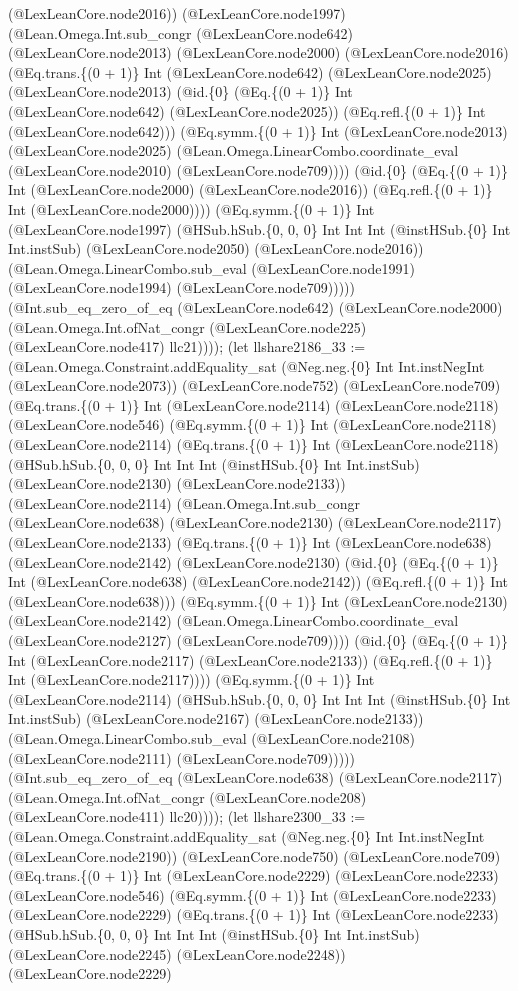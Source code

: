 \documentclass[11pt]{article}
\begin{document}
(@LexLeanCore.node2016)) (@LexLeanCore.node1997) (@Lean.Omega.Int.sub\_congr (@LexLeanCore.node642) (@LexLeanCore.node2013) (@LexLeanCore.node2000) (@LexLeanCore.node2016) (@Eq.trans.\{(0 + 1)\} Int (@LexLeanCore.node642) (@LexLeanCore.node2025) (@LexLeanCore.node2013) (@id.\{0\} (@Eq.\{(0 + 1)\} Int (@LexLeanCore.node642) (@LexLeanCore.node2025)) (@Eq.refl.\{(0 + 1)\} Int (@LexLeanCore.node642))) (@Eq.symm.\{(0 + 1)\} Int (@LexLeanCore.node2013) (@LexLeanCore.node2025) (@Lean.Omega.LinearCombo.coordinate\_eval (@LexLeanCore.node2010) (@LexLeanCore.node709)))) (@id.\{0\} (@Eq.\{(0 + 1)\} Int (@LexLeanCore.node2000) (@LexLeanCore.node2016)) (@Eq.refl.\{(0 + 1)\} Int (@LexLeanCore.node2000)))) (@Eq.symm.\{(0 + 1)\} Int (@LexLeanCore.node1997) (@HSub.hSub.\{0, 0, 0\} Int Int Int (@instHSub.\{0\} Int Int.instSub) (@LexLeanCore.node2050) (@LexLeanCore.node2016)) (@Lean.Omega.LinearCombo.sub\_eval (@LexLeanCore.node1991) (@LexLeanCore.node1994) (@LexLeanCore.node709))))) (@Int.sub\_eq\_zero\_of\_eq (@LexLeanCore.node642) (@LexLeanCore.node2000) (@Lean.Omega.Int.ofNat\_congr (@LexLeanCore.node225) (@LexLeanCore.node417) llc21)))); (let llshare2186\_33 := (@Lean.Omega.Constraint.addEquality\_sat (@Neg.neg.\{0\} Int Int.instNegInt (@LexLeanCore.node2073)) (@LexLeanCore.node752) (@LexLeanCore.node709) (@Eq.trans.\{(0 + 1)\} Int (@LexLeanCore.node2114) (@LexLeanCore.node2118) (@LexLeanCore.node546) (@Eq.symm.\{(0 + 1)\} Int (@LexLeanCore.node2118) (@LexLeanCore.node2114) (@Eq.trans.\{(0 + 1)\} Int (@LexLeanCore.node2118) (@HSub.hSub.\{0, 0, 0\} Int Int Int (@instHSub.\{0\} Int Int.instSub) (@LexLeanCore.node2130) (@LexLeanCore.node2133)) (@LexLeanCore.node2114) (@Lean.Omega.Int.sub\_congr (@LexLeanCore.node638) (@LexLeanCore.node2130) (@LexLeanCore.node2117) (@LexLeanCore.node2133) (@Eq.trans.\{(0 + 1)\} Int (@LexLeanCore.node638) (@LexLeanCore.node2142) (@LexLeanCore.node2130) (@id.\{0\} (@Eq.\{(0 + 1)\} Int (@LexLeanCore.node638) (@LexLeanCore.node2142)) (@Eq.refl.\{(0 + 1)\} Int (@LexLeanCore.node638))) (@Eq.symm.\{(0 + 1)\} Int (@LexLeanCore.node2130) (@LexLeanCore.node2142) (@Lean.Omega.LinearCombo.coordinate\_eval (@LexLeanCore.node2127) (@LexLeanCore.node709)))) (@id.\{0\} (@Eq.\{(0 + 1)\} Int (@LexLeanCore.node2117) (@LexLeanCore.node2133)) (@Eq.refl.\{(0 + 1)\} Int (@LexLeanCore.node2117)))) (@Eq.symm.\{(0 + 1)\} Int (@LexLeanCore.node2114) (@HSub.hSub.\{0, 0, 0\} Int Int Int (@instHSub.\{0\} Int Int.instSub) (@LexLeanCore.node2167) (@LexLeanCore.node2133)) (@Lean.Omega.LinearCombo.sub\_eval (@LexLeanCore.node2108) (@LexLeanCore.node2111) (@LexLeanCore.node709))))) (@Int.sub\_eq\_zero\_of\_eq (@LexLeanCore.node638) (@LexLeanCore.node2117) (@Lean.Omega.Int.ofNat\_congr (@LexLeanCore.node208) (@LexLeanCore.node411) llc20)))); (let llshare2300\_33 := (@Lean.Omega.Constraint.addEquality\_sat (@Neg.neg.\{0\} Int Int.instNegInt (@LexLeanCore.node2190)) (@LexLeanCore.node750) (@LexLeanCore.node709) (@Eq.trans.\{(0 + 1)\} Int (@LexLeanCore.node2229) (@LexLeanCore.node2233) (@LexLeanCore.node546) (@Eq.symm.\{(0 + 1)\} Int (@LexLeanCore.node2233) (@LexLeanCore.node2229) (@Eq.trans.\{(0 + 1)\} Int (@LexLeanCore.node2233) (@HSub.hSub.\{0, 0, 0\} Int Int Int (@instHSub.\{0\} Int Int.instSub) (@LexLeanCore.node2245) (@LexLeanCore.node2248)) (@LexLeanCore.node2229) 
\end{document}

